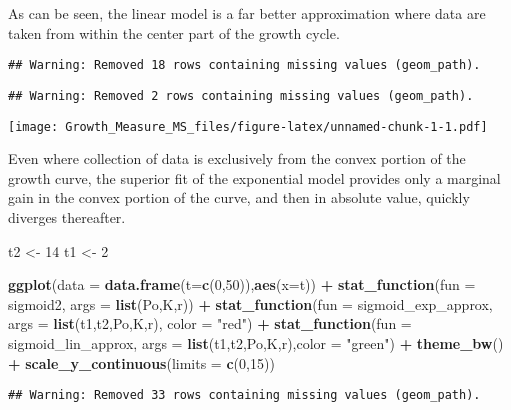 \documentclass[]{article}
\newenvironment{Shaded}{\begin{snugshade}}{\end{snugshade}}
\newcommand{\KeywordTok}[1]{\textcolor[rgb]{0.13,0.29,0.53}{\textbf{#1}}}
\newcommand{\DataTypeTok}[1]{\textcolor[rgb]{0.13,0.29,0.53}{#1}}
\newcommand{\DecValTok}[1]{\textcolor[rgb]{0.00,0.00,0.81}{#1}}
\newcommand{\StringTok}[1]{\textcolor[rgb]{0.31,0.60,0.02}{#1}}
\newcommand{\OperatorTok}[1]{\textcolor[rgb]{0.81,0.36,0.00}{\textbf{#1}}}
\newcommand{\NormalTok}[1]{#1}
\begin{document}
As can be seen, the linear model is a far better approximation where
data are taken from within the center part of the growth cycle.

\begin{verbatim}
## Warning: Removed 18 rows containing missing values (geom_path).
\end{verbatim}

\begin{verbatim}
## Warning: Removed 2 rows containing missing values (geom_path).
\end{verbatim}

\texttt{[image: Growth\_Measure\_MS\_files/figure-latex/unnamed-chunk-1-1.pdf]}

Even where collection of data is exclusively from the convex portion of
the growth curve, the superior fit of the exponential model provides
only a marginal gain in the convex portion of the curve, and then in
absolute value, quickly diverges thereafter.

\begin{Shaded}
\begin{Highlighting}[]
\NormalTok{t2 <-}\StringTok{ }\DecValTok{14}
\NormalTok{t1 <-}\StringTok{ }\DecValTok{2}


\KeywordTok{ggplot}\NormalTok{(}\DataTypeTok{data =} \KeywordTok{data.frame}\NormalTok{(}\DataTypeTok{t=}\KeywordTok{c}\NormalTok{(}\DecValTok{0}\NormalTok{,}\DecValTok{50}\NormalTok{)),}\KeywordTok{aes}\NormalTok{(}\DataTypeTok{x=}\NormalTok{t)) }\OperatorTok{+}\StringTok{ }\KeywordTok{stat_function}\NormalTok{(}\DataTypeTok{fun =}\NormalTok{ sigmoid2, }\DataTypeTok{args =} \KeywordTok{list}\NormalTok{(Po,K,r)) }\OperatorTok{+}\StringTok{ }\KeywordTok{stat_function}\NormalTok{(}\DataTypeTok{fun =}\NormalTok{ sigmoid_exp_approx, }\DataTypeTok{args =} \KeywordTok{list}\NormalTok{(t1,t2,Po,K,r), }\DataTypeTok{color =} \StringTok{"red"}\NormalTok{) }\OperatorTok{+}
\StringTok{  }\KeywordTok{stat_function}\NormalTok{(}\DataTypeTok{fun =}\NormalTok{ sigmoid_lin_approx, }\DataTypeTok{args =} \KeywordTok{list}\NormalTok{(t1,t2,Po,K,r),}\DataTypeTok{color =} \StringTok{"green"}\NormalTok{) }\OperatorTok{+}
\StringTok{  }\KeywordTok{theme_bw}\NormalTok{() }\OperatorTok{+}\StringTok{ }\KeywordTok{scale_y_continuous}\NormalTok{(}\DataTypeTok{limits =} \KeywordTok{c}\NormalTok{(}\DecValTok{0}\NormalTok{,}\DecValTok{15}\NormalTok{))}
\end{Highlighting}
\end{Shaded}

\begin{verbatim}
## Warning: Removed 33 rows containing missing values (geom_path).
\end{verbatim}
\end{document}
